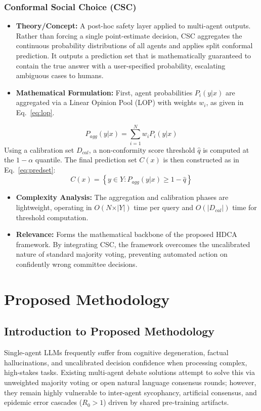 \documentclass[a4paper,fleqn]{cas-sc}
\begin{document}
\subsubsection{Conformal Social Choice (CSC)}
\begin{itemize}
    \item \textbf{Theory/Concept:} A post-hoc safety layer applied to multi-agent outputs. Rather than forcing a single point-estimate decision, CSC aggregates the continuous probability distributions of all agents and applies split conformal prediction. It outputs a prediction set that is mathematically guaranteed to contain the true answer with a user-specified probability, escalating ambiguous cases to humans.
    \item \textbf{Mathematical Formulation:} First, agent probabilities $P_i(y\vert{}x)$ are aggregated via a Linear Opinion Pool (LOP) with weights $w_i$, as given in Eq.~\eqref{eq:lop}.
\end{itemize}
\begin{equation}
    P_{agg}(y\vert{}x) = \sum_{i=1}^{N} w_i P_i(y\vert{}x)
    \label{eq:lop}
\end{equation}
Using a calibration set $D_{cal}$, a non-conformity score threshold $\hat{q}$ is computed at the $1 - \alpha$ quantile. The final prediction set $C(x)$ is then constructed as in Eq.~\eqref{eq:predset}:
\begin{equation}
    C(x) = \left\{ y \in Y : P_{agg}(y\vert{}x) \ge 1 - \hat{q} \right\}
    \label{eq:predset}
\end{equation}
\begin{itemize}
    \item \textbf{Complexity Analysis:} The aggregation and calibration phases are lightweight, operating in $O(N \times \vert{}Y\vert{})$ time per query and $O(\vert{}D_{cal}\vert{})$ time for threshold computation.
    \item \textbf{Relevance:} Forms the mathematical backbone of the proposed HDCA framework. By integrating CSC, the framework overcomes the uncalibrated nature of standard majority voting, preventing automated action on confidently wrong committee decisions.
\end{itemize}

\section{Proposed Methodology}

\subsection{Introduction to Proposed Methodology}
Single-agent LLMs frequently suffer from cognitive degeneration, factual hallucinations, and uncalibrated decision confidence when processing complex, high-stakes tasks. Existing multi-agent debate solutions attempt to solve this via unweighted majority voting or open natural language consensus rounds; however, they remain highly vulnerable to inter-agent sycophancy, artificial consensus, and epidemic error cascades ($R_0 > 1$) driven by shared pre-training artifacts.
\end{document}
